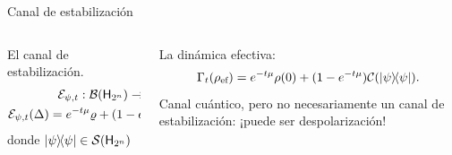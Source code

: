 \begin{frame}{Canal de estabilización}
    \begin{columns}
        \begin{column}{0.5\textwidth}
            El canal de estabilización.
            \begin{gather}
                \mcE_{\psi,t}:\mcB(\hilbert_{2^{n}}) \rightarrow \mcB(\hilbert_{2^{n}})\nonumber\pause\\
                \mcE_{\psi,t}(\Delta)=e^{-t\mu}\varrho+(1-e^{-t \mu})\dyad{\psi}\Tr(\Delta)\rlap{.}\nonumber\pause
            \end{gather}
            donde $\dyad{\psi}\in \densityspace{2^{n}}$
        \end{column}\pause
        \begin{column}{0.5\textwidth}
            La dinámica efectiva:\pause
            \begin{equation}\label{eq:EffectiveStabilizing}
                \Gamma_{t}(\rho_{\ef})=e^{-t\mu}\rho(0)+(1-e^{-t \mu})\mcC(\dyad{\psi}).\nonumber
            \end{equation}\pause
            Canal cuántico, pero no necesariamente un canal de estabilización: ¡puede ser despolarización!
        \end{column}
    \end{columns}
\end{frame}


